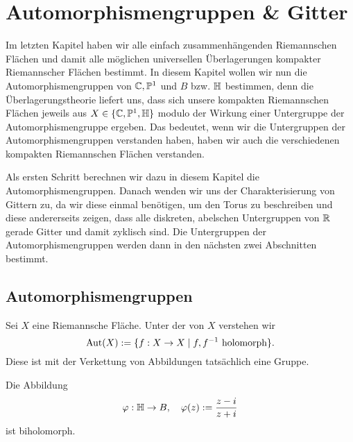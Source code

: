 
\section{Automorphismengruppen \& Gitter}
\label{sec:auto}

Im letzten Kapitel haben wir alle einfach zusammenhängenden
Riemannschen Flächen und damit alle möglichen universellen
Überlagerungen kompakter Riemannscher Flächen bestimmt. In diesem
Kapitel wollen wir nun die Automorphismengruppen von $\mathbb{C}, \mathbb{P}^1$ und $B$
bzw. $\mathbb{H}$ bestimmen, denn die Überlagerungstheorie liefert uns, dass
sich unsere kompakten Riemannschen Flächen jeweils aus $X \in \{ \mathbb{C},
\mathbb{P}^1, \mathbb{H}\}$ modulo der Wirkung einer Untergruppe der
Automorphismengruppe ergeben. Das bedeutet, wenn wir die
Untergruppen der Automorphismengruppen verstanden haben, haben wir
auch die verschiedenen kompakten Riemannschen Flächen verstanden.

Als ersten Schritt berechnen wir dazu in diesem Kapitel die
Automorphismengruppen. Danach wenden wir uns der Charakterisierung von
Gittern zu, da wir diese einmal benötigen, um den Torus zu beschreiben
und diese andererseits zeigen, dass alle diskreten, abelschen
Untergruppen von $\mathbb{R}$ gerade Gitter und damit zyklisch sind. Die
Untergruppen der Automorphismengruppen werden dann in den
nächsten zwei Abschnitten bestimmt.

\subsection{Automorphismengruppen}

\begin{defin}
  Sei $X$ eine Riemannsche Fläche. Unter der
   von $X$ verstehen wir
  \[
  \operatorname{Aut}(X) := \{ f: X \rightarrow X \mid f,f^{-1} \text{ holomorph} \}.
  \]
  Diese ist mit der Verkettung von Abbildungen tatsächlich eine Gruppe.
\end{defin}

\begin{lemma}
  \label{lemma:kreis-halbebene}
  Die Abbildung
  \[
  \varphi: \mathbb{H} \rightarrow B, \quad \varphi(z) := \frac{z-i}{z+i}
  \]
  ist biholomorph.
\end{lemma}

